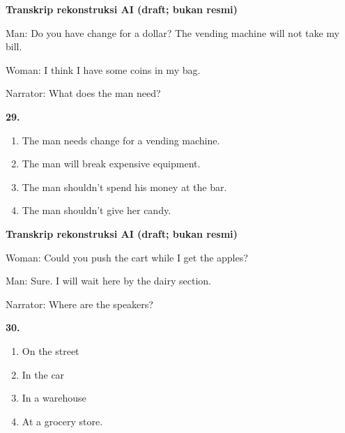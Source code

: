 \documentclass[12pt]{article}
\begin{document}
\par
\vspace{0.25\baselineskip}
\begin{exampleblock}
\textbf{Transkrip rekonstruksi AI (draft; bukan resmi)}\par
Man: Do you have change for a dollar? The vending machine will not take my bill.\par
Woman: I think I have some coins in my bag.\par
Narrator: What does the man need?\par
\end{exampleblock}
\noindent\textbf{29.}
\begin{enumerate}[label=(\Alph*),leftmargin=*,itemsep=0.2em]
\item The man needs change for a vending machine.
\item The man will break expensive equipment.
\item The man shouldn't spend his money at the bar.
\item The man shouldn't give her candy.
\end{enumerate}
\par
\vspace{0.25\baselineskip}
\begin{exampleblock}
\textbf{Transkrip rekonstruksi AI (draft; bukan resmi)}\par
Woman: Could you push the cart while I get the apples?\par
Man: Sure. I will wait here by the dairy section.\par
Narrator: Where are the speakers?\par
\end{exampleblock}
\noindent\textbf{30.}
\begin{enumerate}[label=(\Alph*),leftmargin=*,itemsep=0.2em]
\item On the street
\item In the car
\item In a warehouse
\item At a grocery store.
\end{enumerate}
\par
\vspace{0.25\baselineskip}
\end{document}

